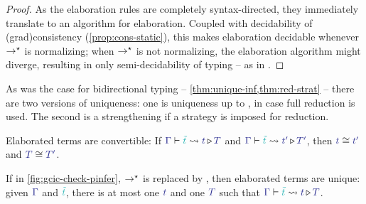 \begin{proof}

  As the elaboration rules are completely syntax-directed, they
  immediately translate to an algorithm for elaboration.
  Coupled with decidability of \kl(grad){consistency} (\cref{prop:cons-static}),
  this makes elaboration decidable whenever $\rightarrow^{\star}$ is normalizing; 
  when $\rightarrow^{\star}$ is not normalizing, the elaboration algorithm might diverge,
  resulting in only semi-decidability of typing – 
  as in \eg {} .

\end{proof}

As was the case for bidirectional typing – \cref{thm:unique-inf,thm:red-strat} –
there are two versions of uniqueness: one is uniqueness up to ,
in case full reduction is used.
The second is a strengthening if a  strategy is imposed for reduction.

\begin{theorem}
	\label{thm:uniqueness}
	Elaborated terms are convertible:
	If $\inferelab{\Gamma}{\tilde{t}}{t}{T}$ and $\inferelab{\Gamma}{\tilde{t}}{t'}{T'}$,
  then $\tcol{t} \conv \tcol{t'}$ and $\tcol{T} \conv \tcol{T'}$.
\end{theorem}

\begin{theorem}
	\label{thm:uniqueness-wh}
	If in \cref{fig:gcic-check-pinfer},  $\rightarrow^{\star}$ is replaced by
  , then elaborated terms are unique:
  given $\tcol{\Gamma}$ and $\scol{\tilde{t}}$, there is at most one $\tcol{t}$
  and one $\tcol{T}$ such that $\inferelab{\Gamma}{\tilde{t}}{t}{T}$.
\end{theorem}

